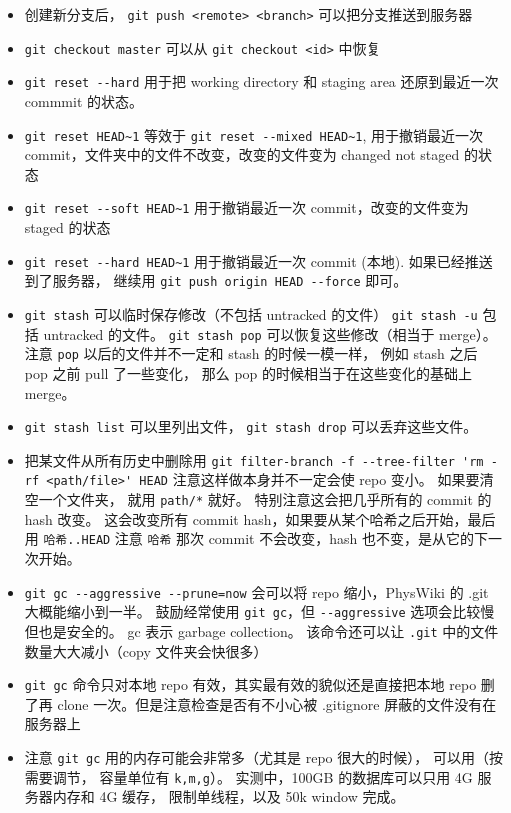 \begin{itemize}
\item 创建新分支后， \verb`git push <remote> <branch>` 可以把分支推送到服务器
\item \verb`git checkout master` 可以从 \verb`git checkout <id>` 中恢复
\item \verb`git reset --hard` 用于把 working directory 和 staging area 还原到最近一次 commmit 的状态。
\item \verb`git reset HEAD~1` 等效于 \verb`git reset --mixed HEAD~1`, 用于撤销最近一次 commit，文件夹中的文件不改变，改变的文件变为 changed not staged 的状态
\item \verb`git reset --soft HEAD~1` 用于撤销最近一次 commit，改变的文件变为 staged 的状态
\item \verb`git reset --hard HEAD~1` 用于撤销最近一次 commit (本地). 如果已经推送到了服务器， 继续用 \verb`git push origin HEAD --force` 即可。
\item \verb`git stash` 可以临时保存修改（不包括 untracked 的文件） \verb`git stash -u` 包括 untracked 的文件。 \verb`git stash pop` 可以恢复这些修改（相当于 merge）。 注意 \verb`pop` 以后的文件并不一定和 stash 的时候一模一样， 例如 stash 之后 pop 之前 pull 了一些变化， 那么 pop 的时候相当于在这些变化的基础上 merge。
\item \verb`git stash list` 可以里列出文件， \verb`git stash drop` 可以丢弃这些文件。
\item 把某文件从所有历史中删除用 \verb`git filter-branch -f --tree-filter 'rm -rf <path/file>' HEAD` 注意这样做本身并不一定会使 repo 变小。 如果要清空一个文件夹， 就用 \verb`path/*` 就好。 特别注意这会把几乎所有的 commit 的 hash 改变。 这会改变所有 commit hash，如果要从某个哈希之后开始，最后用 \verb`哈希..HEAD` 注意 \verb`哈希` 那次 commit 不会改变，hash 也不变，是从它的下一次开始。
\item \verb`git gc --aggressive --prune=now` 会可以将 repo 缩小，PhysWiki 的 .git 大概能缩小到一半。 鼓励经常使用 \verb`git gc`，但 \verb`--aggressive` 选项会比较慢但也是安全的。 gc 表示 garbage collection。 该命令还可以让 \verb`.git` 中的文件数量大大减小（copy 文件夹会快很多）
\item \verb`git gc` 命令只对本地 repo 有效，其实最有效的貌似还是直接把本地 repo 删了再 clone 一次。但是注意检查是否有不小心被 .gitignore 屏蔽的文件没有在服务器上
\item 注意 \verb`git gc` 用的内存可能会非常多（尤其是 repo 很大的时候）， 可以用（按需要调节， 容量单位有 \verb`k,m,g`）。 实测中，100GB 的数据库可以只用 4G 服务器内存和 4G 缓存， 限制单线程，以及 50k window 完成。
\begin{lstlisting}[language=bash]

\end{lstlisting}
\end{itemize}
